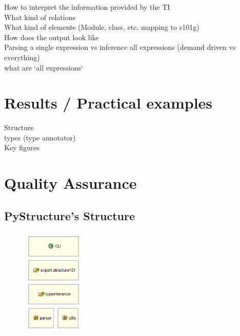 \documentclass[12pt,halfparskip,DIV11,BCOR10mm]{scrreprt}
\begin{document}
How to interpret the information provided by the TI \\
What kind of relations \\
What kind of elements (Module, class, etc. mapping to s101g) \\
How does the output look like \\
Parsing a single expression vs inference all expressions (demand driven vs everything)\\
 what are `all expressions`

\chapter{Results / Practical examples}

Structure \\
types (type annotator)\\
Key figures


\chapter{Quality Assurance}



\section{PyStructure's Structure}

\begin{figure}
    \vspace{-0.6cm}
    \includegraphics[width=3cm]{architecture/parts}
\end{figure}
\end{document}
